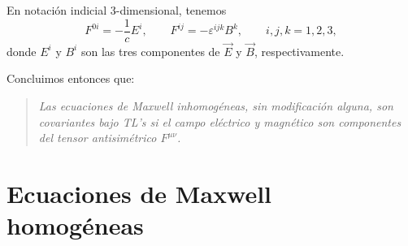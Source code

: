 En notación indicial 3-dimensional, tenemos
\begin{equation}
F^{0i}   =-\frac{1}{c}E^i, \qquad F^{ij}   =-\varepsilon^{ijk}B^{k}, \qquad i,j,k=1,2,3,
\end{equation}
donde $E^i$ y $B^i$ son las tres componentes de $\vec{E}$ y $\vec{B}$, respectivamente.

Concluimos entonces que:
\begin{quotation}
\textit{Las ecuaciones de Maxwell inhomogéneas, sin modificación alguna, son covariantes bajo TL's si el campo eléctrico y magnético son componentes del
tensor antisimétrico $F^{\mu \nu}$.}
\end{quotation}

\section{Ecuaciones de Maxwell homogéneas}


